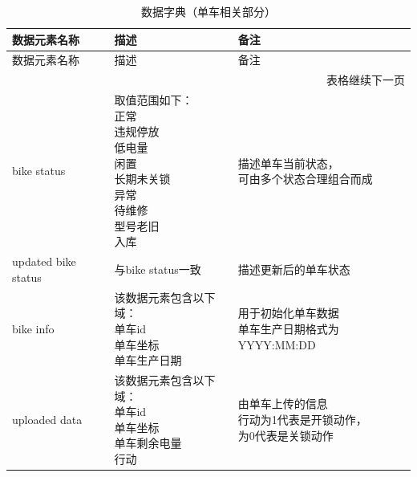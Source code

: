 \begin{longtable}{lll}
    \caption{数据字典（单车相关部分）}\label{DataDictionary4} \\
    \toprule
  数据元素名称&描述&备注\\
  \midrule
  \endfirsthead
    \toprule
  数据元素名称&描述&备注\\
  \midrule
  \endhead

  \midrule
\multicolumn{3}{r}{表格继续下一页} \\
\bottomrule
\endfoot

\bottomrule
\endlastfoot

bike status       &    \makecell[l]{
    取值范围如下：\\
    \quad 正常\\
    \quad 违规停放\\
    \quad 低电量\\
    \quad 闲置\\
    \quad 长期未关锁\\
    \quad 异常\\
    \quad 待维修\\
    \quad 型号老旧\\
    \quad 入库\\
    }         &\makecell[l]{ 描述单车当前状态，\\可由多个状态合理组合而成 }\\
updated bike status               & 与bike status一致                 &描述更新后的单车状态    \\
bike info                         &  \makecell[l]{
    该数据元素包含以下域：\\
    \quad 单车id\\
    \quad 单车坐标\\
    \quad 单车生产日期\\
    }&\makecell[l]{用于初始化单车数据\\单车生产日期格式为YYYY:MM:DD}    \\
uploaded data                         &  \makecell[l]{
    该数据元素包含以下域：\\
    \quad 单车id\\
    \quad 单车坐标\\
    \quad 单车剩余电量\\
    \quad 行动\\
    }&\makecell[l]{由单车上传的信息\\行动为1代表是开锁动作，\\为0代表是关锁动作 }    \\

\end{longtable}
